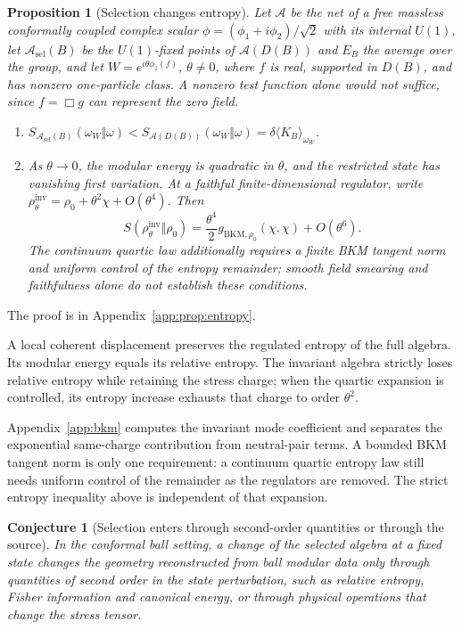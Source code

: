 \documentclass[12pt]{article}
\newtheorem{proposition}[theorem]{Proposition}
\newtheorem{conjecture}[theorem]{Conjecture}
\theoremstyle{definition}
\theoremstyle{remark}
\newcommand{\ev}[1]{\langle #1\rangle}
\begin{document}
\begin{proposition}[Selection changes entropy]\label{prop:entropy}
Let \(\mathcal A\) be the net of a free massless conformally coupled complex scalar
\(\phi=(\phi_1+i\phi_2)/\sqrt2\) with its internal \(U(1)\), let
\(\mathcal A_{\mathrm{sel}}(B)\) be the \(U(1)\)-fixed points of \(\mathcal A(D(B))\) and \(E_B\)
the average over the group, and let \(W=e^{i\theta\phi_1(f)}\), \(\theta\ne0\), where \(f\) is real, supported
in \(D(B)\), and has nonzero one-particle class. A nonzero test function alone
would not suffice, since \(f=\Box g\) can represent the zero field.
\begin{enumerate}[label=(\alph*),leftmargin=2em,itemsep=1pt]
\item \(S_{\mathcal A_{\mathrm{sel}}(B)}(\omega_W\Vert\omega)<S_{\mathcal A(D(B))}(\omega_W\Vert\omega)
=\delta\ev{K_B}_{\omega_W}\).
\item As \(\theta\to0\), the modular energy is quadratic in \(\theta\), and the
restricted state has vanishing first variation. At a faithful finite-dimensional regulator,
write \(\rho^{\mathrm{inv}}_\theta=\rho_0+\theta^2\chi+O(\theta^4)\). Then
\[
S(\rho^{\mathrm{inv}}_\theta\Vert\rho_0)
=\frac{\theta^4}{2}g_{\mathrm{BKM},\rho_0}(\chi,\chi)+O(\theta^6).
\]
The continuum quartic law additionally requires a finite BKM tangent norm and
uniform control of the entropy remainder; smooth field smearing and faithfulness
alone do not establish these conditions.
\end{enumerate}
\end{proposition}

The proof is in Appendix~\ref{app:prop:entropy}.


A local coherent displacement preserves the regulated entropy of the full algebra.
Its modular energy equals its relative entropy. The invariant algebra strictly loses
relative entropy while retaining the stress charge; when the quartic expansion is
controlled, its entropy increase exhausts that charge to order \(\theta^2\).

Appendix~\ref{app:bkm} computes the invariant mode coefficient and separates the
exponential same-charge contribution from neutral-pair terms. A bounded BKM tangent
norm is only one requirement: a continuum quartic entropy law still needs uniform
control of the remainder as the regulators are removed. The strict entropy inequality
above is independent of that expansion.

\begin{conjecture}[Selection enters through second-order quantities or through the source]\label{conj:selection}
In the conformal ball setting, a change of the selected algebra at a fixed state changes the
geometry reconstructed from ball modular data only through quantities of second order in
the state perturbation, such as relative entropy, Fisher information and canonical energy,
or through physical operations that change the stress tensor.
\end{conjecture}
\end{document}
